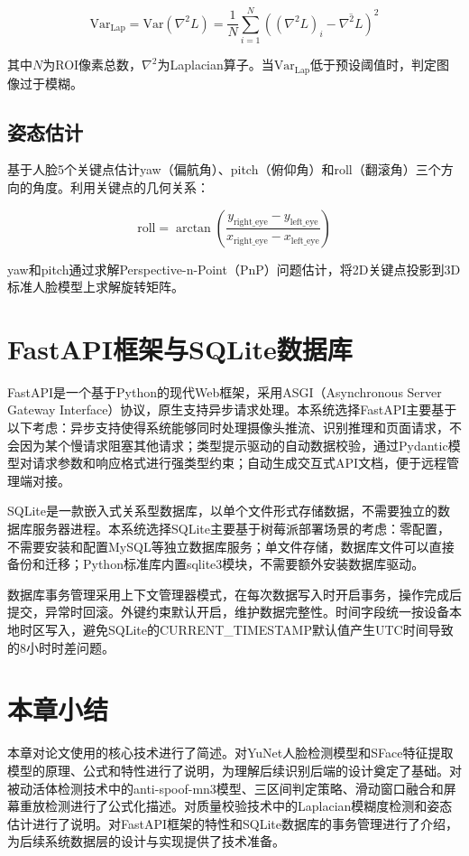 \begin{equation}
    \text{Var}_{\text{Lap}} = \text{Var}\left( \nabla^2 L \right) = \frac{1}{N} \sum_{i=1}^{N} \left( (\nabla^2 L)_i - \overline{\nabla^2 L} \right)^2
\end{equation}

其中$N$为ROI像素总数，$\nabla^2$为Laplacian算子。当$\text{Var}_{\text{Lap}}$低于预设阈值时，判定图像过于模糊。

\subsection{姿态估计}

基于人脸5个关键点估计yaw（偏航角）、pitch（俯仰角）和roll（翻滚角）三个方向的角度。利用关键点的几何关系：

\begin{equation}
    \text{roll} = \arctan\left( \frac{y_{\text{right\_eye}} - y_{\text{left\_eye}}}{x_{\text{right\_eye}} - x_{\text{left\_eye}}} \right)
\end{equation}

yaw和pitch通过求解Perspective-n-Point（PnP）问题估计，将2D关键点投影到3D标准人脸模型上求解旋转矩阵。

\section{FastAPI框架与SQLite数据库}

FastAPI是一个基于Python的现代Web框架，采用ASGI（Asynchronous Server Gateway Interface）协议，原生支持异步请求处理。本系统选择FastAPI主要基于以下考虑：异步支持使得系统能够同时处理摄像头推流、识别推理和页面请求，不会因为某个慢请求阻塞其他请求；类型提示驱动的自动数据校验，通过Pydantic模型对请求参数和响应格式进行强类型约束；自动生成交互式API文档，便于远程管理端对接。

SQLite是一款嵌入式关系型数据库，以单个文件形式存储数据，不需要独立的数据库服务器进程。本系统选择SQLite主要基于树莓派部署场景的考虑：零配置，不需要安装和配置MySQL等独立数据库服务；单文件存储，数据库文件可以直接备份和迁移；Python标准库内置sqlite3模块，不需要额外安装数据库驱动。

数据库事务管理采用上下文管理器模式，在每次数据写入时开启事务，操作完成后提交，异常时回滚。外键约束默认开启，维护数据完整性。时间字段统一按设备本地时区写入，避免SQLite的CURRENT\_TIMESTAMP默认值产生UTC时间导致的8小时时差问题。

\section{本章小结}

本章对论文使用的核心技术进行了简述。对YuNet人脸检测模型和SFace特征提取模型的原理、公式和特性进行了说明，为理解后续识别后端的设计奠定了基础。对被动活体检测技术中的anti-spoof-mn3模型、三区间判定策略、滑动窗口融合和屏幕重放检测进行了公式化描述。对质量校验技术中的Laplacian模糊度检测和姿态估计进行了说明。对FastAPI框架的特性和SQLite数据库的事务管理进行了介绍，为后续系统数据层的设计与实现提供了技术准备。
